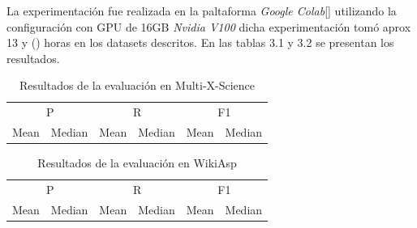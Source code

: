 La experimentación fue realizada en la paltaforma \emph{Google Colab}[\cite{colab}] utilizando la configuración con GPU de 16GB \emph{Nvidia V100} dicha experimentación tomó aprox 13 y () horas en los datasets descritos. En las tablas 3.1 y 3.2 se presentan los resultados.

\begin{table}[htb]
    \centering
    \label{tab:example}
    \begin{tabular}{*6c}
      \toprule
      \multicolumn{2}{c}{P}  & \multicolumn{2}{c}{R} & \multicolumn{2}{c}{F1} \\ \cmidrule(r){1-2} \cmidrule(r){3-4} \cmidrule(l){5-6}
      Mean & Median  &  Mean & Median &     Mean & Median   \\
                                                      
      \bottomrule
    \end{tabular}
    \caption{Resultados de la evaluación en Multi-X-Science}

  \end{table}

  \begin{table}[htb]
    \centering
    \label{tab:example}
    \begin{tabular}{*6c}
      \toprule
      \multicolumn{2}{c}{P}  & \multicolumn{2}{c}{R} & \multicolumn{2}{c}{F1} \\ \cmidrule(r){1-2} \cmidrule(r){3-4} \cmidrule(l){5-6}
      Mean & Median  &  Mean & Median &     Mean & Median   \\
                                                      
      \bottomrule
    \end{tabular}
    \caption{Resultados de la evaluación en WikiAsp}

  \end{table}